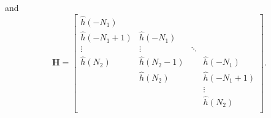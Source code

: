 and
\begin{equation} 
\mathbf{H} = 
		\begin{bmatrix}
		\hat{h}(-N_1)		&  				& 		 	&  					\\
		\hat{h}(-N_1+1) 	& \hat{h}(-N_1)	& 		 	&  					\\
		\vdots	 			& \vdots		& \ddots 	&  					\\
		\hat{h}(N_2)		& \hat{h}(N_2-1)&  			& \hat{h}(-N_1)  	\\
		 					& \hat{h}(N_2) 	&  			& \hat{h}(-N_1+1) 	\\
		 					&  	   			&  			& \vdots			\\
		 					&  	   			&  			& \hat{h}(N_2)		\\
	\end{bmatrix}.
\end{equation}

